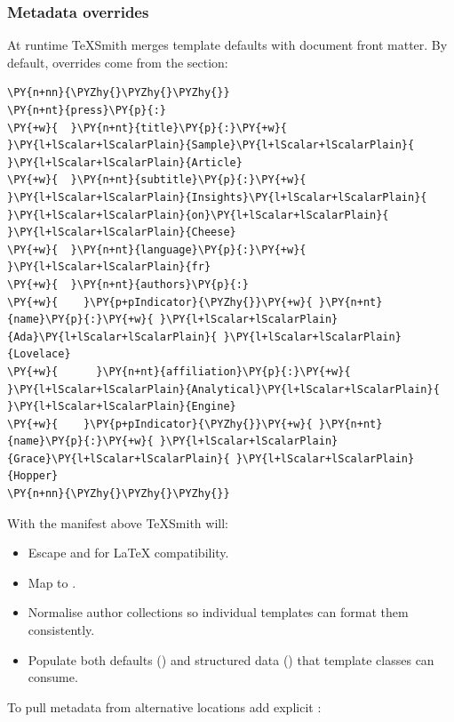 \documentclass[a4paper,twoside]{article}
\begin{document}
\subsubsection{Metadata overrides}
At runtime TeXSmith merges template defaults with document front matter. By default, overrides come from the  section:
\begin{tscode}[lang=yaml, engine=pygments]
\begin{Verbatim}[commandchars=\\\{\},breaklines, breakanywhere, commandchars=\\\{\}]
\PY{n+nn}{\PYZhy{}\PYZhy{}\PYZhy{}}
\PY{n+nt}{press}\PY{p}{:}
\PY{+w}{  }\PY{n+nt}{title}\PY{p}{:}\PY{+w}{ }\PY{l+lScalar+lScalarPlain}{Sample}\PY{l+lScalar+lScalarPlain}{ }\PY{l+lScalar+lScalarPlain}{Article}
\PY{+w}{  }\PY{n+nt}{subtitle}\PY{p}{:}\PY{+w}{ }\PY{l+lScalar+lScalarPlain}{Insights}\PY{l+lScalar+lScalarPlain}{ }\PY{l+lScalar+lScalarPlain}{on}\PY{l+lScalar+lScalarPlain}{ }\PY{l+lScalar+lScalarPlain}{Cheese}
\PY{+w}{  }\PY{n+nt}{language}\PY{p}{:}\PY{+w}{ }\PY{l+lScalar+lScalarPlain}{fr}
\PY{+w}{  }\PY{n+nt}{authors}\PY{p}{:}
\PY{+w}{    }\PY{p+pIndicator}{\PYZhy{}}\PY{+w}{ }\PY{n+nt}{name}\PY{p}{:}\PY{+w}{ }\PY{l+lScalar+lScalarPlain}{Ada}\PY{l+lScalar+lScalarPlain}{ }\PY{l+lScalar+lScalarPlain}{Lovelace}
\PY{+w}{      }\PY{n+nt}{affiliation}\PY{p}{:}\PY{+w}{ }\PY{l+lScalar+lScalarPlain}{Analytical}\PY{l+lScalar+lScalarPlain}{ }\PY{l+lScalar+lScalarPlain}{Engine}
\PY{+w}{    }\PY{p+pIndicator}{\PYZhy{}}\PY{+w}{ }\PY{n+nt}{name}\PY{p}{:}\PY{+w}{ }\PY{l+lScalar+lScalarPlain}{Grace}\PY{l+lScalar+lScalarPlain}{ }\PY{l+lScalar+lScalarPlain}{Hopper}
\PY{n+nn}{\PYZhy{}\PYZhy{}\PYZhy{}}
\end{Verbatim}
\end{tscode}
With the manifest above TeXSmith will:
\begin{itemize}
\item Escape  and  for \LaTeX{} compatibility.
\item Map  to .
\item Normalise author collections so individual templates can format them consistently.
\item Populate both defaults () and structured data () that template classes can consume.
\end{itemize}
To pull metadata from alternative locations add explicit :
\end{document}

